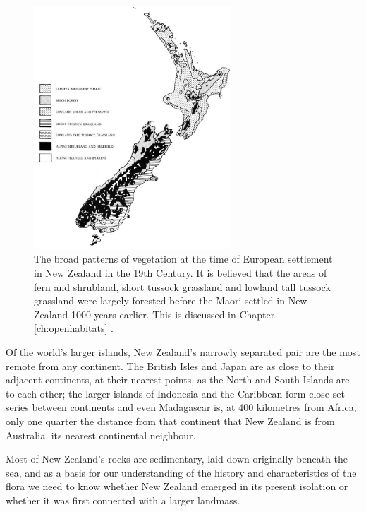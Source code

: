 \begin{figure}
	\includegraphics[width=0.66\textwidth]{graphics/figure1vegetation-patterns.jpg}
	\centering
    \caption[Broad patterns of vegetation]{The broad patterns of vegetation at the time of European settlement in New Zealand in the 19th Century. 
    It is believed that the areas of fern and shrubland, short tussock grassland and lowland tall tussock grassland were largely forested before the Maori settled in New Zealand 1000 years earlier. 
    This is discussed in Chapter \ref{ch:openhabitats} .}
	\label{fig:1vegetationpatterns}
\end{figure}

Of the world's larger islands, New Zealand's narrowly separated pair are the most remote from any continent.
The British Isles and Japan are as close to their adjacent continents, at their nearest points, as the North and South Islands are to each other; the larger islands of Indonesia and the Caribbean form close set series between continents and even Madagascar is, at 400 kilometres from Africa, only one quarter the distance from that continent that New Zealand is from Australia, its nearest continental neighbour.

Most of New Zealand's rocks are sedimentary, laid down originally beneath the sea, and as a basis for our understanding of the history and characteristics of the flora we need to know whether New Zealand emerged in its present isolation or whether it was first connected with a larger landmass.

